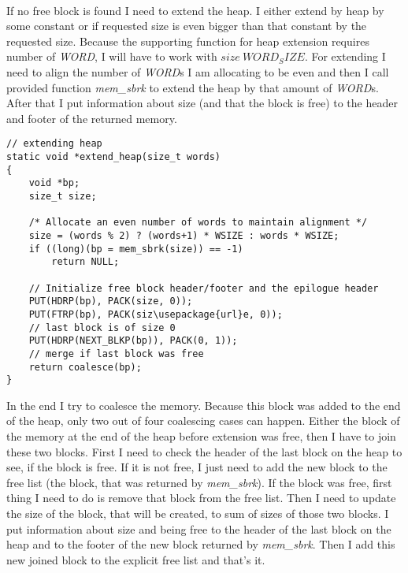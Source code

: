 \documentclass[a4paper]{article}
\begin{document}
\\
If no free block is found I need to extend the heap. I either extend by heap by some constant or
if requested size is even bigger than that constant by the requested size. Because the supporting 
function for heap extension requires number of \textit{WORD}, I will have to work 
with $size \ WORD_SIZE$. 
For extending I need to align the 
number of \textit{WORD}s I am allocating to be even and then I call provided function 
\textit{mem\_sbrk}
to extend the heap by that amount of \textit{WORD}s. After that I put information 
about size (and that the block
is free) to the header and footer of the returned memory.
\begin{lstlisting}[caption= {function for extending heap}]
// extending heap
static void *extend_heap(size_t words)
{
	void *bp;
	size_t size;

	/* Allocate an even number of words to maintain alignment */
	size = (words % 2) ? (words+1) * WSIZE : words * WSIZE;
	if ((long)(bp = mem_sbrk(size)) == -1)
		return NULL;

	// Initialize free block header/footer and the epilogue header
	PUT(HDRP(bp), PACK(size, 0));
	PUT(FTRP(bp), PACK(siz\usepackage{url}e, 0));
	// last block is of size 0
	PUT(HDRP(NEXT_BLKP(bp)), PACK(0, 1));
	// merge if last block was free
	return coalesce(bp);
}
\end{lstlisting}

In the end I try to coalesce the memory.
Because this block was added to the end of the heap, only two out of four coalescing cases can happen.
Either the block of the memory at the end of the heap before extension
was free, then I have to join these two blocks. First I need to check the header of the last 
block on the heap to see, if the block is free. If it is not free, I just need to add the  
new block to the free list (the block, that was returned by \textit{mem\_sbrk}).
If the block was free, first thing I need to do is remove that block from the free list.
Then I need to update the size of the block, that will be created, to sum of sizes of those
two blocks. I put information about size and being free to the header of the last block on the heap
and to the footer of the new block returned by \textit{mem\_sbrk}. Then I add this new joined
block to the explicit free list and that's it.
\end{document}
